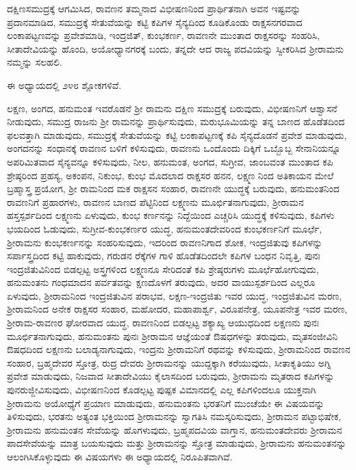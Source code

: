 ದಕ್ಷಿಣಸಮುದ್ರಕ್ಕೆ ಆಗಮಿಸಿದ, ರಾವಣನ ತಮ್ಮನಾದ ವಿಭೀಷಣನಿಂದ ಪ್ರಾರ್ಥಿತನಾಗಿ ಅವನ ಇಷ್ಟವನ್ನು ಪ್ರದಾನಮಾಡಿದ, ಸಮುದ್ರಕ್ಕೆ ಸೇತುವೆಯನ್ನು ಕಟ್ಟಿ ಕಪಿಗಳ ಸೈನ್ಯದಿಂದ ಕೂಡಿಕೊಂಡು ರಾಕ್ಷಸನಗರವಾದ ಲಂಕಾಪಟ್ಟಣವನ್ನು ಪ್ರವೇಶಮಾಡಿ, ಇಂದ್ರಜಿತ್, ಕುಂಭಕರ್ಣ, ರಾವಣನೇ ಮುಂತಾದ ರಾಕ್ಷಸರನ್ನು ಸಂಹರಿಸಿ, ಸೀತಾದೇವಿಯನ್ನು ಹೊಂದಿ, ಅಯೋಧ್ಯಾನಗರಕ್ಕೆ ಬಂದು, ತನ್ನದೇ ಆದ ರಾಜ್ಯ ಪದವಿಯನ್ನು ಸ್ವೀಕರಿಸಿದ ಶ‍್ರೀರಾಮನು ನಮ್ಮನ್ನು ಸಲಹಲಿ.

ಈ ಅಧ್ಯಾಯದಲ್ಲಿ ೨೪೮ ಶ್ಲೋಕಗಳಿವೆ.

ಲಕ್ಷಣ, ಅಂಗದ, ಹನುಮಂತ ಇವರೊಡನೆ ಶ‍್ರೀ ರಾಮನು ದಕ್ಷಿಣ ಸಮುದ್ರಕ್ಕೆ ಬರುವುದು, ವಿಭೀಷಣನಿಗೆ ಆಶ್ವಾಸನೆ ನೀಡುವುದು, ಸಮುದ್ರ ರಾಜನು ಶ‍್ರೀ ರಾಮನನ್ನು ಪ್ರಾರ್ಥಿಸುವುದು, ಮರುಭೂಮಿಯನ್ನು ತನ್ನ ಬಾಣದ ಹೊಡೆತದಿಂದ ಫಲವತ್ತಾಗಿ ಮಾಡುವುದು, ಸಮುದ್ರಕ್ಕೆ ಸೇತುವೆಯನ್ನು ಕಟ್ಟಿ ಲಂಕಾಪಟ್ಟಣಕ್ಕೆ ಕಪಿ ಸೈನ್ಯದೊಡನೆ ಪ್ರವೇಶ ಮಾಡುವುದು, ಅಂಗದನನ್ನು ಸಂಧಾನಕ್ಕೆ ರಾವಣನ ಬಳಿಗೆ ಕಳಿಸುವುದು, ರಾವಣನು ಒಂದೊಂದು ದಿಕ್ಕಿಗೆ ಒಬ್ಬೊಬ್ಬ ಸೇನಾನಿಯನ್ನೂ ಅಪರಿಮಿತವಾದ ಸೈನ್ಯವನ್ನೂ ಕಳಿಸುವುದು, ನೀಲ, ಹನುಮಂತ, ಅಂಗದ, ಸುಗ್ರೀವ, ಜಾಂಬವಂತ ಮುಂತಾದ ಕಪಿ ಶ್ರೇಷ್ಠರಿಂದ ಪ್ರಹಸ್ಯ, ಅಕಂಪನ, ನಿಕುಂಭ, ಕುಂಭ ಮೊದಲಾದ ರಾಕ್ಷಸರ ಹನನ, ಲಕ್ಷ್ಮಣ ನಿಂದ ಅತಿಕಾಯನ ಮೇಲೆ ಬ್ರಹ್ಮಾಸ್ತ್ರ ಪ್ರಯೋಗ, ಶ‍್ರೀ ರಾಮನಿಂದ ಮಕ ರಾಕ್ಷಸನ ಸಂಹಾರ, ರಾವಣನೇ ಯುದ್ಧಕ್ಕೆ ಬರುವುದು, ಹನುಮಂತನಿಂದ ರಾವಣನಿಗೆ ಪ್ರಹಾರಗಳು, ರಾವಣನ ಬಾಣದ ಪೆಟ್ಟಿನಿಂದ ಲಕ್ಷ್ಮಣನು ಮೂರ್ಛಿತನಾಗುವುದು, ಶ‍್ರೀರಾಮನ ಹಸ್ತಸ್ಪರ್ಶದಿಂದ ಲಕ್ಷ್ಮಣನು ಏಳುವುದು, ಕುಂಭ ಕರ್ಣನನ್ನು ನಿದ್ದೆಯಿಂದ ಎಚ್ಚರಿಸಿ ಯುದ್ಧಕ್ಕೆ ಕಳಿಸುವುದು, ಕಪಿಗಳು ಭಯದಿಂದ ಓಡುವುದು, ಸುಗ್ರೀವ-ಕುಂಭಕರ್ಣರ ಯುದ್ಧ, ಹನುಮಂತದೇವರಿಂದ ಕುಂಭಕರ್ಣನಿಗೆ ಮೂರ್ಛೆ, ಶ‍್ರೀರಾಮನು ಕುಂಭಕರ್ಣನನ್ನು ಸಂಹರಿಸುವುದು, ಇದರಿಂದ ರಾವಣನಿಗಾದ ಶೋಕ, ಇಂದ್ರಜಿತುವು ಕಪಿಗಳನ್ನು ಸರ್ಪಾಸ್ತ್ರದಿಂದ ಕಟ್ಟಿ ಹಾಕುವುದು, ಗರುಡನ ರೆಕ್ಕೆಗಳ ಗಾಳಿ ಹೊಡೆತದಿಂದಲೇ ಕಪಿಗಳ ಬಂಧನ ನಿವೃತ್ತಿ, ಪುನಃ ಇಂದ್ರಜಿತುವಿನಿಂದ ಬಿಡಲ್ಪಟ್ಟ ಅಸ್ತ್ರಗಳಿಂದ ಲಕ್ಷ್ಮಣನೂ ಸೇರಿದಂತೆ ಕಪಿ ಶ್ರೇಷ್ಠರುಗಳು ಮೂರ್ಛೆ\break ಹೋಗುವುದು, ಹನುಮಂತನು ಗಂಧಮಾದನ ಪರ್ವತವನ್ನು ಕ್ಷಣದೊಳಗೆ ತರುವುದು, ಅದರ ವಾಯುಸ್ಪರ್ಶದಿಂದ ಎಲ್ಲರೂ ಏಳುವುದು, ಶ‍್ರೀರಾಮನಿಂದ ಇಂದ್ರಜಿತುವಿನ ಪರಾಭವ, ಲಕ್ಷಣ-ಇಂದ್ರಜಿತು ಇವರ ಯುದ್ಧ, ಇಂದ್ರಜಿತುವಿನ ಮರಣ, ಶ‍್ರೀರಾಮನಿಂದ ಅನೇಕ ರಾಕ್ಷಸರ ಸಂಹಾರ, ಮಹೋದರ, ಮಹಾಪಾರ್ಶ್ವ, ವಿರೂಪನೇತ್ರ, ಯೂಪನೇತ್ರ ಇವರ ಮರಣ, ಶ‍್ರೀರಾಮ-ರಾವಣರ ಘೋರವಾದ ಯುದ್ಧ, ರಾವಣನಿಂದ ಬಿಡಲ್ಪಟ್ಟ ಶಕ್ಯಾಖ್ಯ ಆಯುಧದಿಂದ ಲಕ್ಷಣನು ಪುನಃ ಮೂರ್ಛಿತನಾಗುವುದು, ಹನುಮಂತನು ಪುನಃ ಶ‍್ರೀರಾಮನ ಆಜ್ಞೆಯಂತೆ ಔಷಧಗಳನ್ನು ತರುವುದು, ಮೃತಸಂಜೀವಿನಿ ಔಷಧದಿಂದ ಲಕ್ಷಣನು ಬಲಾಡ್ಯನಾಗುವುದು, ಇಂದ್ರನು ಶ‍್ರೀರಾಮನಿಗೆ ರಥವನ್ನು ಕಳಿಸುವುದು, ಶ‍್ರೀರಾಮನಿಂದ ರಾವಣನ ಸಂಹಾರ, ಬ್ರಹ್ಮದೇವರ ಸ್ತೋತ್ರ, ರುದ್ರ ದೇವರು ಶ‍್ರೀರಾಮನನ್ನು ಯುದ್ದಕ್ಕಾಗಿ ಕರೆಯುವುದು, ಸೀತಾಕೃತಿಯು ಅಗ್ನಿ ಪ್ರವೇಶ ಮಾಡುವುದು, ನಿಜವಾದ ಸೀತಾದೇವಿಯು ಕೈಲಾಸದಿಂದ ಬರುವುದು, ಶ‍್ರೀರಾಮನು ಮೃತರಾದ ಕಪಿಗಳನ್ನು ಪುನರುಜ್ಜೀವಿಸುವುದು, ವಿಭೀಷಣನಿಂದ ಕೊಡಲ್ಪಟ್ಟ ಪುಷ್ಪಕ ವಿಮಾನದಲ್ಲಿ ಎಲ್ಲ ಕಪಿಗಳಿಂದಲೂ ಯುಕ್ತನಾಗಿ ಶ‍್ರೀರಾಮನು ಅಯೋಧ್ಯೆಗೆ ಪ್ರಯಾಣ ಮಾಡುವುದು, ಹನುಮಂತನು ಭರತನಿಗೆ ಮುಂಚೆಯೇ ಈ ವಿಷಯವನ್ನು ತಿಳಿಸುವುದು, ಭರತನು ಅತ್ಯಂತ ಭಕ್ತಿಯಿಂದ ಶ‍್ರೀರಾಮನನ್ನು ಸ್ವಾಗತಿಸಿ ನಮಸ್ಕರಿಸುವುದು, ಶ‍್ರೀರಾಮನ ಪಟ್ಟಾಭಿಷೇಕ, ಶ‍್ರೀರಾಮನು ಹನುಮಂತನ ಸೇವೆಯನ್ನು ಹೊಗಳುವುದು, ಬ್ರಹ್ಮಪದವಿಯ ವಾಗ್ತಾನ, ಹನುಮಂತದೇವರು ಶ‍್ರೀರಾಮನ ಪಾದಸೇವೆಯನ್ನು ಮಾತ್ರ ಬಯಸುವುದು ಮತ್ತು ಶ‍್ರೀರಾಮನನ್ನು ಸ್ತೋತ್ರ ಮಾಡುವುದು, ಶ‍್ರೀರಾಮನು ಹನುಮಂತನನ್ನು ಆಲಂಗಿಸಿಕೊಳ್ಳುವುದು ಈ ವಿಷಯಗಳು ಈ ಅಧ್ಯಾಯದಲ್ಲಿ ನಿರೂಪಿತವಾಗಿವೆ.



